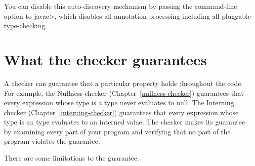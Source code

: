 You can disable this auto-discovery mechanism by passing the
 command-line option to \<javac>, which disables all
annotation processing including all pluggable type-checking.




\section{What the checker guarantees\label{checker-guarantees}}

A checker can guarantee that a particular property holds throughout the
code.  For example, the Nullness checker (Chapter~\ref{nullness-checker})
guarantees that every expression whose type is a  type never
evaluates to null.  The Interning checker (Chapter~\ref{interning-checker})
guarantees that every expression whose type is an  type
evaluates to an interned value.  The checker makes its guarantee by
examining every part of your program and verifying that no part of the
program violates the guarantee.

There are some limitations to the guarantee.


